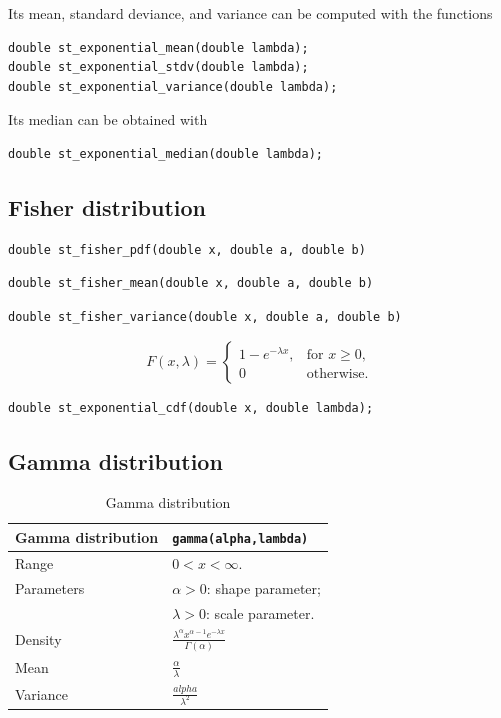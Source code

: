 Its mean, standard deviance, and variance can be computed with the functions
\begin{verbatim}
double st_exponential_mean(double lambda);
double st_exponential_stdv(double lambda);
double st_exponential_variance(double lambda);
\end{verbatim}

Its median can be obtained with
\begin{verbatim}
double st_exponential_median(double lambda);
\end{verbatim}

\subsection{Fisher distribution}

\begin{verbatim}
double st_fisher_pdf(double x, double a, double b)
\end{verbatim}

\begin{verbatim}
double st_fisher_mean(double x, double a, double b)
\end{verbatim}

\begin{verbatim}
double st_fisher_variance(double x, double a, double b)
\end{verbatim}

\[
F(x, \lambda) = \begin{cases}
1-e^{-\lambda x}, & \mbox{for } x \geq 0,\\
0 & \mbox{otherwise.}
\end{cases}
\]

\begin{verbatim}
double st_exponential_cdf(double x, double lambda);
\end{verbatim}

\subsection{Gamma distribution}
\label{sec:stat_gamma}

\begin{table}[htb]
\begin{tabularx}{\textwidth}{ll}
Gamma distribution & \verb|gamma(alpha,lambda)| \\
\hline
Range & $0 < x < \infty$.\\
Parameters & $\alpha > 0$: shape parameter; \\
& $\lambda > 0$: scale parameter. \\
Density &
$\frac{\lambda^\alpha x^{\alpha - 1}e^{-\lambda x}}{\Gamma(\alpha)}$
\\
Mean & $\frac{\alpha}{\lambda}$ \\
Variance & $\frac{alpha}{\lambda^2}$ \\
\hline
\end{tabularx}
\caption{Gamma distribution}
\end{table}

